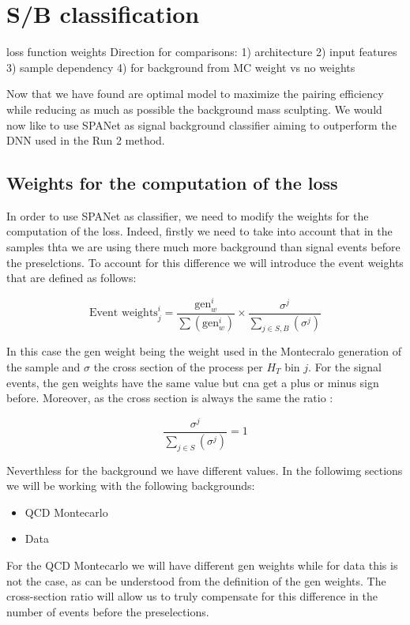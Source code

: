 \section{S/B classification}

loss function weights
Direction for comparisons:
		1) architecture
		2) input features
		3) sample dependency
		4) for background from MC weight vs no weights


Now that we have found are optimal model to maximize the pairing efficiency while 
reducing as much as possible the background mass sculpting.
We would now like to use SPANet as signal background classifier aiming 
to outperform the DNN used in the Run 2 method.

\subsection{Weights for the computation of the loss}

In order to use SPANet as classifier, we need to modify the weights
for the computation of the loss. Indeed, firstly we need to take into account that in the samples thta we are using
there much more background than signal events before the preselctions.
To account for this difference we will introduce the event weights that are
defined as follows:

\begin{equation*}
	\text{Event weights}^i_j=\frac{\text{gen}^i_w}{\sum (\text{gen}^i_w)} \times \frac{\sigma^j}{\sum_{j\in S,B}(\sigma^j)}
\end{equation*}

In this case the gen weight being the weight used in the Montecralo generation of the sample
and $\sigma$ the cross section of the process per $H_T$ bin $j$. For the signal events,
the gen weights have the same value but cna get a plus or minus sign before. Moreover, as the cross section is always the same
the ratio :

\begin{equation*}
	\frac{\sigma^j}{\sum_{j\in S}(\sigma^j)}=1
\end{equation*}

Neverthless for the background we have different values. In the followimg sections we will be 
working with the following backgrounds:

\begin{itemize}
	\item QCD Montecarlo
	\item Data
\end{itemize}

For the QCD Montecarlo we will have different gen weights while for data this is not the case, as can be understood from the definition 
of the gen weights. The cross-section ratio will allow us to truly compensate for this difference in the number of events before the preselections.
